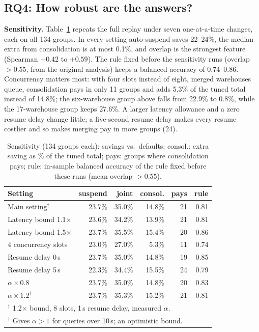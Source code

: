 \documentclass[conference]{IEEEtran}
\begin{document}
\subsection{RQ4: How robust are the answers?}\label{sec:rq4}
\textbf{Sensitivity.} Table~\ref{tab:sens} repeats the full replay under seven one-at-a-time changes, each on all 134
groups. In every setting auto-suspend saves 22--24\%, the median extra from consolidation is at most 0.1\%, and overlap is
the strongest feature (Spearman $+0.42$ to $+0.59$). The rule fixed before the sensitivity runs (overlap $>0.55$, from the original analysis) keeps a balanced accuracy of
0.74--0.86. Concurrency matters most: with four slots instead of eight, merged warehouses queue, consolidation pays in only
11 groups and adds 5.3\%
of the tuned total instead of 14.8\%; the six-warehouse group above falls from 22.9\% to 0.8\%, while the 17-warehouse group
keeps 27.6\%. A larger latency allowance and a zero resume delay change little; a five-second resume delay makes every
resume costlier and so makes merging pay in more groups (24).

\begin{table}[t]
\caption{Sensitivity (134 groups each): savings vs.\ defaults; consol.: extra saving as \% of the tuned total; pays: groups
where consolidation pays; rule: in-sample balanced accuracy of the rule fixed before these runs (mean overlap $>0.55$).}\label{tab:sens}
\centering\scriptsize
\setlength{\tabcolsep}{3.2pt}
\begin{tabular}{lrrrrr}
\toprule
Setting & suspend & joint & consol. & pays & rule \\
\midrule
Main setting$^\dagger$       & 23.7\% & 35.0\% & 14.8\% & 21 & 0.81 \\
Latency bound 1.1$\times$    & 23.6\% & 34.2\% & 13.9\% & 21 & 0.81 \\
Latency bound 1.5$\times$    & 23.7\% & 35.5\% & 15.4\% & 20 & 0.86 \\
4 concurrency slots          & 23.0\% & 27.0\% & 5.3\%  & 11 & 0.74 \\
Resume delay 0\,s            & 23.7\% & 35.0\% & 14.8\% & 19 & 0.85 \\
Resume delay 5\,s            & 22.3\% & 34.4\% & 15.5\% & 24 & 0.79 \\
$\alpha \times 0.8$          & 23.7\% & 35.0\% & 14.8\% & 20 & 0.83 \\
$\alpha \times 1.2^\ddagger$ & 23.7\% & 35.3\% & 15.2\% & 21 & 0.81 \\
\bottomrule
\multicolumn{6}{l}{$^\dagger$ 1.2$\times$ bound, 8 slots, 1\,s resume delay, measured $\alpha$.}\\
\multicolumn{6}{l}{$^\ddagger$ Gives $\alpha > 1$ for queries over 10\,s; an optimistic bound.}\\
\end{tabular}
\end{table}
\end{document}
